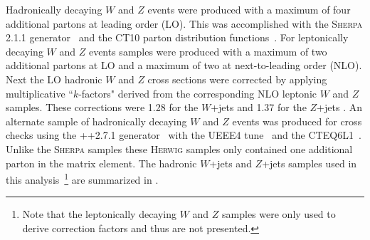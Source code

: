 Hadronically decaying $W$ and $Z$ events were produced with a maximum of four
additional partons at leading order (LO).  This was accomplished with the
\textsc{Sherpa} 2.1.1 generator~\cite{Gleisberg:2008ta} and the CT10 parton
distribution functions~\cite{Lai:2010vv}.  For leptonically decaying $W$ and
$Z$ events samples were produced with a maximum of two additional partons at LO
and a maximum of two at next-to-leading order (NLO).  Next the LO hadronic $W$
and $Z$ cross sections were corrected by applying multiplicative ``$k$-factors"
derived from the corresponding NLO leptonic $W$ and $Z$ samples.  These
corrections were 1.28 for the $W$+jets and 1.37 for the $Z$+jets
\cite{Aaboud:2018zba}. An alternate sample of hadronically decaying $W$ and $Z$
events was produced for cross checks using the ++2.7.1
generator~\cite{Bahr:2008pv} with the UEEE4 tune~\cite{Buckley:2018wdv} and the
CTEQ6L1~\cite{Pumplin:2002vw}.  Unlike the \textsc{Sherpa} samples these
\textsc{Herwig} samples only contained one additional parton in the matrix
element. The hadronic $W$+jets and $Z$+jets samples used in this
analysis~\footnote{Note that the leptonically decaying $W$ and $Z$
samples were only used to derive correction factors and thus are not
presented.} are summarized in .

